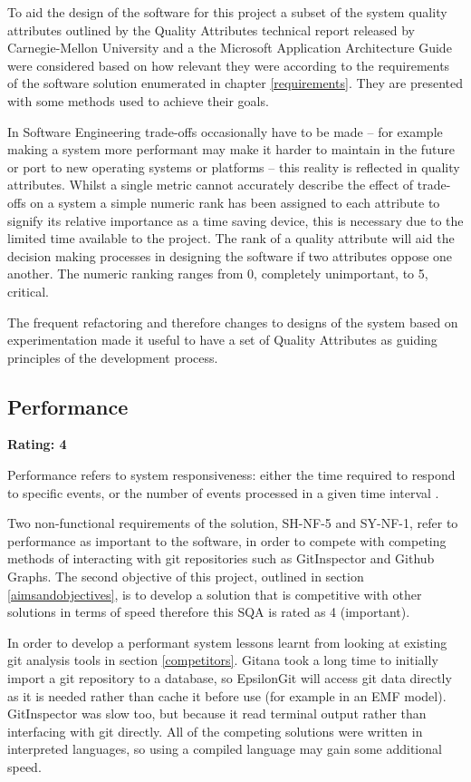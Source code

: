 \documentclass[11pt]{book}
\begin{document}
To aid the design of the software for this project a subset of the system quality attributes outlined by the Quality Attributes technical report released by Carnegie-Mellon University and a the Microsoft Application Architecture Guide \cite{qualitymicrosoft} were considered based on how relevant they were according to the requirements of the software solution enumerated in chapter \ref{requirements}. They are presented with some methods used to achieve their goals.

In Software Engineering trade-offs occasionally have to be made -- for example making a system more performant may make it harder to maintain in the future or port to new operating systems or platforms -- this reality is reflected in quality attributes. Whilst a single metric cannot accurately describe the effect of trade-offs on a system a simple numeric rank has been assigned to each attribute to signify its relative importance as a time saving device, this is necessary due to the limited time available to the project. The rank of a quality attribute will aid the decision making processes in designing the software if two attributes oppose one another. The numeric ranking ranges from 0, completely unimportant, to 5, critical.

The frequent refactoring and therefore changes to designs of the system based on experimentation made it useful to have a set of Quality Attributes as guiding principles of the development process.

\subsection{Performance}
\textbf{Rating: 4}

Performance refers to system responsiveness: either the time required to respond to specific events, or the number of events processed in a given time interval \cite{performancedefinition}.

Two non-functional requirements of the solution, SH-NF-5 and SY-NF-1, refer to performance as important to the software, in order to compete with competing methods of interacting with git repositories such as GitInspector and Github Graphs. The second objective of this project, outlined in section \ref{aimsandobjectives}, is to develop a solution that is competitive with other solutions in terms of speed therefore this SQA is rated as 4 (important).

In order to develop a performant system lessons learnt from looking at existing git analysis tools in section \ref{competitors}. Gitana took a long time to initially import a git repository to a database, so EpsilonGit will access git data directly as it is needed rather than cache it before use (for example in an EMF model). GitInspector was slow too, but because it read terminal output rather than interfacing with git directly. All of the competing solutions were written in interpreted languages, so using a compiled language may gain some additional speed.
\end{document}
